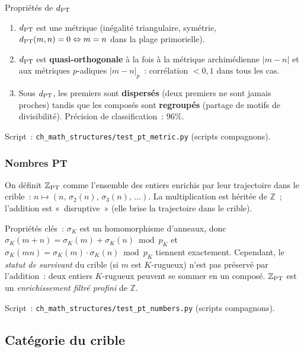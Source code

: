 \documentclass[12pt,a4paper]{article}
\begin{document}
\begin{thmbox}{Propriétés de $d_{\rm PT}$}
\label{thm:pt_metric}
\begin{enumerate}[nosep]
\item $d_{\rm PT}$ est une métrique (inégalité triangulaire, symétrie,
  $d_{\rm PT}(m,n) = 0 \Leftrightarrow m = n$ dans la plage
  primorielle).
\item $d_{\rm PT}$ est \textbf{quasi-orthogonale} à la fois à la
  métrique archimédienne $|m - n|$ et aux métriques $p$-adiques
  $|m-n|_p$~: corrélation $< 0{,}1$ dans tous les cas.
\item Sous $d_{\rm PT}$, les premiers sont \textbf{dispersés} (deux
  premiers ne sont jamais proches) tandis que les composés sont
  \textbf{regroupés} (partage de motifs de divisibilité). Précision de
  classification~: $96\%$.
\end{enumerate}
Script~: \texttt{ch\_math\_structures/test\_pt\_metric.py} (scripts
compagnons).
\end{thmbox}

\subsubsection{Nombres PT}

\begin{definition}
\label{def:pt_numbers}
On définit $\mathbb{Z}_{\rm PT}$ comme l'ensemble des entiers enrichis
par leur trajectoire dans le crible~:
$n \mapsto (n,\, \sigma_2(n),\, \sigma_3(n),\, \ldots)$.
La multiplication est héritée de $\mathbb{Z}$~; l'addition est
«~disruptive~» (elle brise la trajectoire dans le crible).
\end{definition}

Propriétés clés~: $\sigma_K$ est un homomorphisme d'anneaux, donc
$\sigma_K(m+n) = \sigma_K(m) + \sigma_K(n) \bmod p_K$ et
$\sigma_K(mn) = \sigma_K(m) \cdot \sigma_K(n) \bmod p_K$ tiennent
exactement. Cependant, le \emph{statut de survivant} du crible (si
$m$ est $K$-rugueux) n'est pas préservé par l'addition~: deux entiers
$K$-rugueux peuvent se sommer en un composé. $\mathbb{Z}_{\rm PT}$
est un \emph{enrichissement filtré profini} de $\mathbb{Z}$.

Script~: \texttt{ch\_math\_structures/test\_pt\_numbers.py} (scripts
compagnons).


\subsection{Catégorie du crible}
\label{sec:ms_category}
\end{document}
